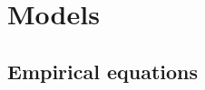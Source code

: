 \section{Models} \label{sec:et:models}

\subsection{Empirical equations}\label{sec:et:emp}


%
%
%
%
%


